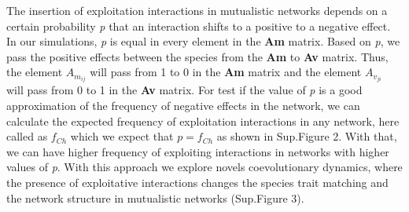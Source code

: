 \documentclass[a4paper, 12pt]{article}
\begin{document}
The insertion of exploitation interactions in mutualistic networks depends on a certain probability \textit{p} that an interaction shifts to a positive to a negative effect. In our simulations, \textit{p} is equal in every element in the \textbf{Am} matrix. Based on \textit{p}, we pass the positive effects between the species from the \textbf{Am} to \textbf{Av} matrix. Thus, the element $A_{m_{ij}}$ will pass from 1 to 0 in the \textbf{Am} matrix and the element $A_{v_{ji}}$ will pass from 0 to 1 in the \textbf{Av} matrix. For test if the value of \textit{p} is a good approximation of the frequency of negative effects in the network, we can calculate the expected frequency of exploitation interactions in any network, here called as $f_{Ch}$ which we expect that $p =f_{Ch}$ as shown in Sup.Figure 2. With that, we can have higher frequency of exploiting interactions in networks with higher values of \textit{p}. With this approach we explore novels coevolutionary dynamics, where the presence of exploitative interactions changes the species trait matching and the network structure in mutualistic networks (Sup.Figure 3).
\end{document}
